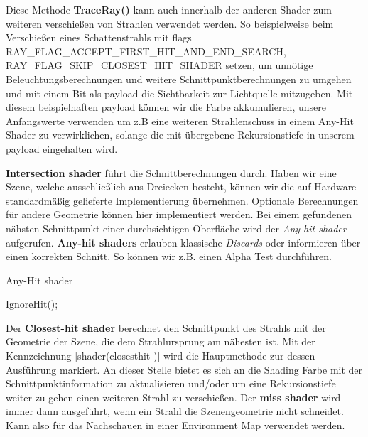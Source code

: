 Diese Methode \textbf{TraceRay()} kann auch innerhalb der anderen Shader zum weiteren verschießen
von Strahlen verwendet werden. So beispielweise beim Verschießen eines Schattenstrahls mit flags 
RAY\_FLAG\_ACCEPT\_FIRST\_HIT\_AND\_END\_SEARCH, \newline
RAY\_FLAG\_SKIP\_CLOSEST\_HIT\_SHADER setzen, um unnötige 
Beleuchtungsberechnungen und weitere Schnittpunktberechnungen zu umgehen und mit einem Bit als payload 
die Sichtbarkeit zur Lichtquelle mitzugeben.
Mit diesem beispielhaften payload können wir die Farbe akkumulieren, unsere  
Anfangswerte verwenden um z.B eine weiteren Strahlenschuss in einem Any-Hit Shader zu verwirklichen,  
solange die mit übergebene Rekursionstiefe in unserem payload eingehalten wird.  

\textbf{Intersection shader} führt die Schnittberechnungen durch.
Haben wir eine Szene, welche ausschließlich aus Dreiecken besteht, können wir
die auf Hardware standardmäßig gelieferte Implementierung übernehmen. 
Optionale Berechnungen für andere Geometrie können hier implementiert werden.
Bei einem gefundenen nähsten Schnittpunkt einer durchsichtigen Oberfläche wird der 
\textit{Any-hit shader} aufgerufen.
\textbf{Any-hit shaders} erlauben klassische \textit{Discards} oder informieren
über einen korrekten Schnitt. So können wir z.B. einen Alpha Test durchführen.

\begin{tcolorbox}
\begin{algorithm}[H]
    \caption{Any-Hit shader}
    \begin{algorithmic}[1]
        \State IgnoreHit();
        \EndIf
    \end{algorithmic}
    \label{alg:any hit}
\end{algorithm}
\end{tcolorbox}

Der \textbf{Closest-hit shader} berechnet den Schnittpunkt des Strahls mit der Geometrie
der Szene, die dem Strahlursprung am nähesten ist.
Mit der Kennzeichnung [shader(\dq closesthit \dq)] wird die Hauptmethode zur 
dessen Ausführung markiert. An dieser Stelle bietet es sich an die Shading Farbe 
mit der Schnittpunktinformation zu aktualisieren und/oder um eine Rekursionstiefe weiter 
zu gehen einen weiteren Strahl zu verschießen. 
Der \textbf{miss shader} wird immer dann ausgeführt, wenn ein Strahl die
Szenengeometrie nicht schneidet. Kann also für das Nachschauen in einer 
Environment Map verwendet werden. 

